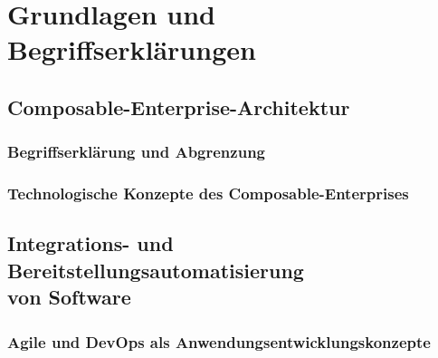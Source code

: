 \section{Grundlagen und Begriffserklärungen}

\subsection{Composable-Enterprise-Architektur}

\subsubsection{Begriffserklärung und Abgrenzung}

\subsubsection{Technologische Konzepte des Composable-Enterprises}

\newpage
\subsection{Integrations- und Bereitstellungsautomatisierung \\von Software}


\subsubsection{Agile und DevOps als Anwendungsentwicklungskonzepte}

